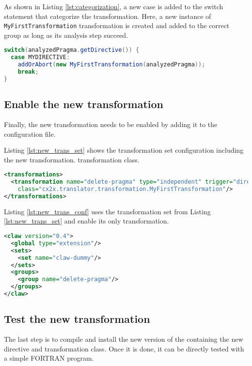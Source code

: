 As shown in Listing \ref{lst:categorization}, a new case is added to the switch
statement that categorize the transformation. Here, a new instance of
\lstinline|MyFirstTransformation| transformation is created and added to the
correct group as long as its analysis step succeed.

\begin{lstlisting}[label=lst:categorization, caption=ClawXcodeMlTranslator.java, language=java]
switch(analyzedPragma.getDirective()) {
  case MYDIRECTIVE:
    addOrAbort(new MyFirstTransformation(analyzedPragma));
    break;
}
\end{lstlisting}


\subsection{Enable the new transformation}
Finally, the new transformation needs to be enabled by adding it to the
configuration file.

Listing \ref{lst:new_trans_set} shows the transformation set configuration
including the new transformation.
transformation class.


\begin{lstlisting}[label=lst:new_trans_set, caption=claw-dummy-set.xml, language=xml]
<transformations>
  <transformation name="delete-pragma" type="independent" trigger="directive"
    class="cx2x.translator.transformation.MyFirstTransformation"/>
</transformations>
\end{lstlisting}

Listing \ref{lst:new_trans_conf} uses the transformation set from Listing 
\ref{lst:new_trans_set} and enable its only transformation.

\begin{lstlisting}[label=lst:new_trans_conf, caption=claw-dummy.xml, language=xml]
<claw version="0.4">
  <global type="extension"/>
  <sets>
    <set name="claw-dummy"/>
  </sets>
  <groups>
    <group name="delete-pragma"/>
  </groups>
</claw>
\end{lstlisting}

\subsection{Test the new transformation}
The last step is to compile and install the new version of the \clawfcomp
containing the new directive and transformation class. Once it is done, it
can be directly tested with a simple FORTRAN program.

